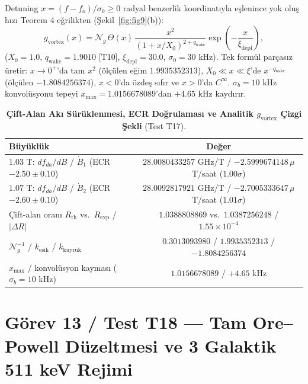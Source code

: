 \documentclass[12pt,a4paper]{article}
\begin{document}
Detuning $x=(f-f_o)/\sigma_0\ge0$ radyal benzerlik koordinatıyla eşlenince yok oluş hızı Teorem 4 eğrilikten (Şekil~\ref{fig:fig9}(b)):
\begin{equation}
g_{\mathrm{vortex}}(x) = \mathcal{N}_g\,\Theta(x)\,\frac{x^2}{(1+x/X_0)^{2+q_{\mathrm{wake}}}}\exp\left(-\frac{x}{\xi_{\mathrm{depl}}}\right),
\label{eq:gvortex}
\end{equation}
($X_0=1.0$, $q_{\mathrm{wake}}=1.9010$ [T10], $\xi_{\mathrm{depl}}=30.0$, $\sigma_0=30\text{ kHz}$). Tek formül parçasız üretir: $x\to0^+$'da tam $x^2$ (ölçülen eğim $1.9935352313$), $X_0\ll x\ll\xi$'de $x^{-q_{\mathrm{wake}}}$ (ölçülen $-1.8084256374$), $x<0$'da özdeş sıfır ve $x>0$'da $C^\infty$. $\sigma_b=10\text{ kHz}$ konvolüsyonu tepeyi $x_{\max}=1.0156678089$'dan $+4.65\text{ kHz}$ kaydırır.

\begin{table}[!htbp]
\centering
\footnotesize
\setlength{\tabcolsep}{3pt}
\caption{\textbf{Çift-Alan Akı Sürüklenmesi, ECR Doğrulaması ve Analitik $g_{\mathrm{vortex}}$ Çizgi Şekli} (Test T17).}
\label{tab:t17}
\vspace{0.1cm}
\begin{tabular}{@{}l|c@{}}
\hline
Büyüklük & Değer \\
\hline
$1.03\text{ T}$: $df_{da}/dB$ / $\dot{B}_1$ (ECR $-2.50\pm0.10$) & $28.0080433257$ GHz/T / $-2.5999674148\,\mu$T/saat ($1.00\sigma$) \\
$1.07\text{ T}$: $df_{da}/dB$ / $\dot{B}_2$ (ECR $-2.60\pm0.10$) & $28.0092817921$ GHz/T / $-2.7005333647\,\mu$T/saat ($1.01\sigma$) \\
Çift-alan oranı $R_{\mathrm{th}}$ vs.\ $R_{\mathrm{exp}}$ / $\vert{}\Delta R\vert{}$ & $1.0388808869$ vs.\ $1.0387256248$ / $1.55\times10^{-4}$ \\
$\mathcal{N}_g^{-1}$ / $k_{\mathrm{esik}}$ / $k_{\mathrm{kuyruk}}$ & $0.3013093980$ / $1.9935352313$ / $-1.8084256374$ \\
$x_{\max}$ / konvolüsyon kayması ($\sigma_b=10$ kHz) & $1.0156678089$ / $+4.65$ kHz \\
\hline
\end{tabular}
\end{table}

\section{Görev 13 / Test T18 --- Tam Ore--Powell Düzeltmesi ve 3 Galaktik 511 keV Rejimi}
\end{document}
